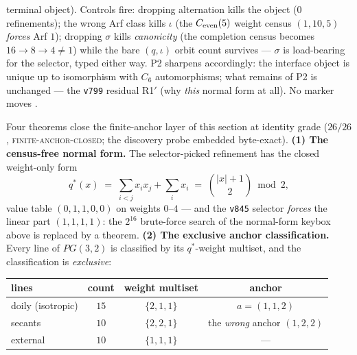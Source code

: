 \documentclass[11pt,a4paper]{article}
\theoremstyle{definition}
\begin{document}
\begin{keybox}
terminal object).  Controls fire: dropping alternation kills the
object ($0$ refinements); the wrong Arf class kills $\iota$ (the
$C_{\rm even}(5)$ weight census $(1,10,5)$ \emph{forces} Arf
$1$); dropping $\sigma$ kills \emph{canonicity} (the completion
census becomes $16 \to 8 \to 4 \ne 1$) while the bare
$(q,\iota)$ orbit count survives --- $\sigma$ is load-bearing
for the selector, typed either way.  P2 sharpens accordingly:
the interface object is unique up to isomorphism with $C_6$
automorphisms; what remains of P2 is unchanged --- the
\texttt{v799} residual R1$'$ (why \emph{this} normal form at
all).  No marker moves \mE.
\end{keybox}

\begin{keybox}[The four finite anchor theorems (2026-08-09) --- the census-free $q^{*}$, the exclusive anchor classification, the doily as a multiplication table, and the $g=5$ exhaustion \mE\ (\veri{v880\_finite\_anchor\_theorems.py})]
Four theorems close the finite-anchor layer of this section at
identity grade ($26/26$, \textsc{finite-anchor-closed}; the
discovery probe embedded byte-exact).  \textbf{(1) The
census-free normal form.}  The selector-picked refinement has the
closed weight-only form
\[
q^{*}(x) \;=\; \sum_{i<j} x_i x_j + \sum_i x_i
\;=\; \binom{|x|+1}{2} \bmod 2,
\]
value table $(0,1,1,0,0)$ on weights $0$--$4$ --- and the
\texttt{v845} selector \emph{forces} the linear part $(1,1,1,1)$:
the $2^{16}$ brute-force search of the normal-form keybox above is
replaced by a theorem.  \textbf{(2) The exclusive anchor
classification.}  Every line of $PG(3,2)$ is classified by its
$q^{*}$-weight multiset, and the classification is
\emph{exclusive}:

\begin{center}
\begin{tabular}{lccc}
lines & count & weight multiset & anchor\\
\hline
doily (isotropic) & $15$ & $\{2,1,1\}$ & $a = (1,1,2)$\\
secants & $10$ & $\{2,2,1\}$ & the \emph{wrong} anchor $(1,2,2)$\\
external & $10$ & $\{1,1,1\}$ & ---\\
\end{tabular}
\end{center}


\end{keybox}
\end{document}
